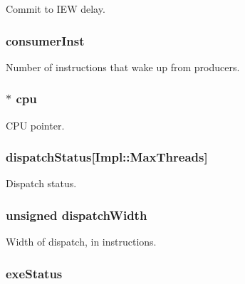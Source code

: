 \label{classDefaultIEW_a6b6fe1148ed7c40758e45f351c375552}
Commit to IEW delay. \hypertarget{classDefaultIEW_a69b21b8b0360b93b3088bbf183fe6abf}{
\subsubsection[{consumerInst}]{ {\bf consumerInst}}}
\label{classDefaultIEW_a69b21b8b0360b93b3088bbf183fe6abf}
Number of instructions that wake up from producers. \hypertarget{classDefaultIEW_a1379cf882a12ac6fc9eba5da7c84b18b}{
\subsubsection[{cpu}]{$\ast$ {\bf cpu}}}
\label{classDefaultIEW_a1379cf882a12ac6fc9eba5da7c84b18b}
CPU pointer. \hypertarget{classDefaultIEW_a2ab1f59ca15f38f95b082415285ee273}{
\subsubsection[{dispatchStatus}]{ {\bf dispatchStatus}\mbox{[}Impl::MaxThreads\mbox{]}}}
\label{classDefaultIEW_a2ab1f59ca15f38f95b082415285ee273}
Dispatch status. \hypertarget{classDefaultIEW_acd9a559a5f1d57c32c03c9a5b4299089}{
\subsubsection[{dispatchWidth}]{\setlength{\rightskip}{0pt plus 5cm}unsigned {\bf dispatchWidth}}}
\label{classDefaultIEW_acd9a559a5f1d57c32c03c9a5b4299089}
Width of dispatch, in instructions. \hypertarget{classDefaultIEW_ab8c04349b85b4d9bf03a601deee720b4}{
\subsubsection[{exeStatus}]{ {\bf exeStatus}}}
